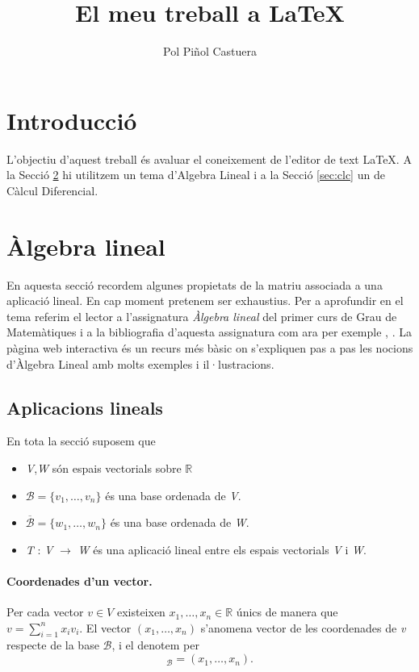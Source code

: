 \documentclass[a4paper,12pt]{article}
\title{El meu treball a \LaTeX}
\author{Pol Piñol Castuera}
\date{}
\begin{document}
\maketitle
\tableofcontents
\section{Introducció}
L'objectiu d'aquest treball és avaluar el coneixement de l'editor de text \LaTeX.
A la Secció \ref{sec:alg} hi utilitzem un tema d'Algebra Lineal i a la Secció \ref{sec:clc} un de Càlcul Diferencial. %
\section{Àlgebra lineal}\label{sec:alg}
En aquesta secció recordem algunes propietats de la matriu associada a una
aplicació lineal. En cap moment pretenem ser exhaustius. Per a aprofundir
en el tema referim el lector a l'assignatura \textit{Àlgebra lineal} del primer curs
de Grau de Matemàtiques i a la bibliografia d'aquesta assignatura com ara
per exemple \cite{1}, \cite{2}. La pàgina web interactiva \cite{3} és un recurs més bàsic on s'expliquen pas a pas les nocions d'Àlgebra Lineal amb molts exemples i il·lustracions.
\subsection{Aplicacions lineals}
En tota la secció suposem que
\begin{itemize}
\item \textit{V},\textit{W} són espais vectorials sobre $\mathbb{R}$
\item $\mathcal{B} = \{v_{1},\ldots, v_{n} \}$ és una base ordenada de \textit{V}.
\item $\overline{\mathcal{B}}=\{w_{1},\ldots, w_{n} \}$ és una base ordenada de \textit{W}.
\item \textit{T} : \textit{V} $\rightarrow$ \textit{W} és una aplicació lineal entre els espais vectorials \textit{V} i \textit{W}.
\end{itemize}

\paragraph{Coordenades d'un vector.}  Per cada vector $v \in V$ existeixen $x_{1}, \ldots, x_{n} \in \mathbb{R}$ únics de manera que $v =\sum_{i=1}^n x_{i}v_{i}$. El vector $(x_{1}, \ldots, x_{n})$ s'anomena vector de les coordenades de \textit{v} respecte de la base $\mathcal{B}$, i el denotem per \begin{equation} [v]_{\mathcal{B}}=(x_{1}, \ldots, x_{n}).  \end{equation}
\end{document}
